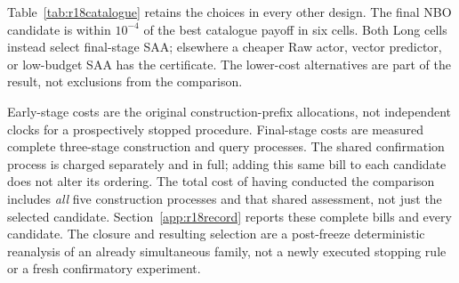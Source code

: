 Table~\ref{tab:r18catalogue} retains the choices in every other design.
The final NBO candidate is within $10^{-4}$ of the best catalogue payoff
in six cells. Both Long cells instead select final-stage SAA; elsewhere a
cheaper Raw actor, vector predictor, or low-budget SAA has the certificate.
The lower-cost alternatives are part of the result, not exclusions from
the comparison.

Early-stage costs are the original construction-prefix allocations, not
independent clocks for a prospectively stopped procedure. Final-stage costs
are measured complete three-stage construction and query processes. The
shared confirmation process is charged separately and in full; adding this
same bill to each candidate does not alter its ordering. The total cost of
having conducted the comparison includes \emph{all} five construction
processes and that shared assessment, not just the selected candidate.
Section~\ref{app:r18record} reports these complete bills and every candidate.
The closure and resulting selection are a post-freeze deterministic
reanalysis of an already simultaneous family, not a newly executed stopping
rule or a fresh confirmatory experiment.
